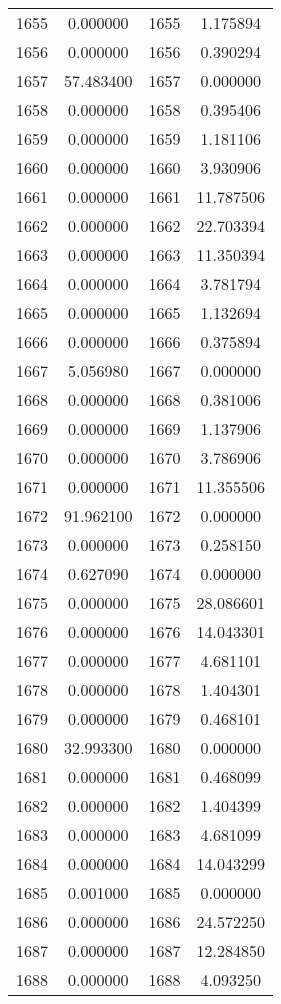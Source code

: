 \documentclass[12pt]{article}
\begin{document}
\begin{longtable}{@{}cccc@{}}
1655 & 0.000000 & 1655 & 1.175894 \\
1656 & 0.000000 & 1656 & 0.390294 \\
1657 & 57.483400 & 1657 & 0.000000 \\
1658 & 0.000000 & 1658 & 0.395406 \\
1659 & 0.000000 & 1659 & 1.181106 \\
1660 & 0.000000 & 1660 & 3.930906 \\
1661 & 0.000000 & 1661 & 11.787506 \\
1662 & 0.000000 & 1662 & 22.703394 \\
1663 & 0.000000 & 1663 & 11.350394 \\
1664 & 0.000000 & 1664 & 3.781794 \\
1665 & 0.000000 & 1665 & 1.132694 \\
1666 & 0.000000 & 1666 & 0.375894 \\
1667 & 5.056980 & 1667 & 0.000000 \\
1668 & 0.000000 & 1668 & 0.381006 \\
1669 & 0.000000 & 1669 & 1.137906 \\
1670 & 0.000000 & 1670 & 3.786906 \\
1671 & 0.000000 & 1671 & 11.355506 \\
1672 & 91.962100 & 1672 & 0.000000 \\
1673 & 0.000000 & 1673 & 0.258150 \\
1674 & 0.627090 & 1674 & 0.000000 \\
1675 & 0.000000 & 1675 & 28.086601 \\
1676 & 0.000000 & 1676 & 14.043301 \\
1677 & 0.000000 & 1677 & 4.681101 \\
1678 & 0.000000 & 1678 & 1.404301 \\
1679 & 0.000000 & 1679 & 0.468101 \\
1680 & 32.993300 & 1680 & 0.000000 \\
1681 & 0.000000 & 1681 & 0.468099 \\
1682 & 0.000000 & 1682 & 1.404399 \\
1683 & 0.000000 & 1683 & 4.681099 \\
1684 & 0.000000 & 1684 & 14.043299 \\
1685 & 0.001000 & 1685 & 0.000000 \\
1686 & 0.000000 & 1686 & 24.572250 \\
1687 & 0.000000 & 1687 & 12.284850 \\
1688 & 0.000000 & 1688 & 4.093250 \\

\end{longtable}
\end{document}
